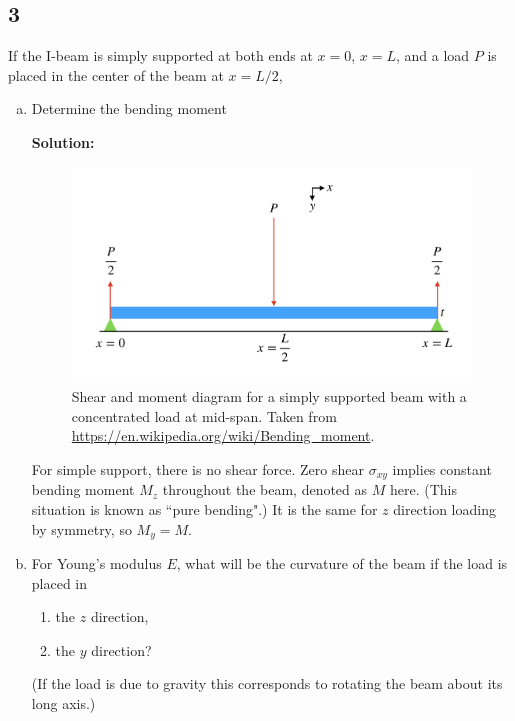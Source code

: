\documentclass[12pt]{article}
\begin{document}
\subsection{3}
If the I-beam is simply supported at both ends at $x=0$, $x=L$, and a load $P$ is placed in the center of the beam at $x=L/2$,
\begin{enumerate}[(a)]
	\item Determine the bending moment

	      \textbf{Solution:}
	      \begin{figure}[h]
		      \centering
		      \includegraphics[width=0.6\linewidth]{images/support}
		      \caption{Shear and moment diagram for a simply supported beam with a concentrated load at mid-span. Taken from \url{https://en.wikipedia.org/wiki/Bending_moment}.}
		      \label{fig:support}
	      \end{figure}
	      For simple support, there is no shear force.
	      Zero shear $\sigma_{xy}$ implies constant bending moment $M_z$ throughout the beam, denoted as
	      $M$ here. (This situation is known as ``pure bending".)
	      It is the same for $z$ direction loading by symmetry, so $M_y = M$.
	      

	\item For Young's modulus $E$, what will be the curvature of the beam if the load is placed in
	      \begin{enumerate}[(b1)]
		      \item the $z$ direction,
		      \item the $y$ direction?
	      \end{enumerate}
	      (If the load is due to gravity this corresponds to rotating the beam about its long axis.)


\end{enumerate}
\end{document}
